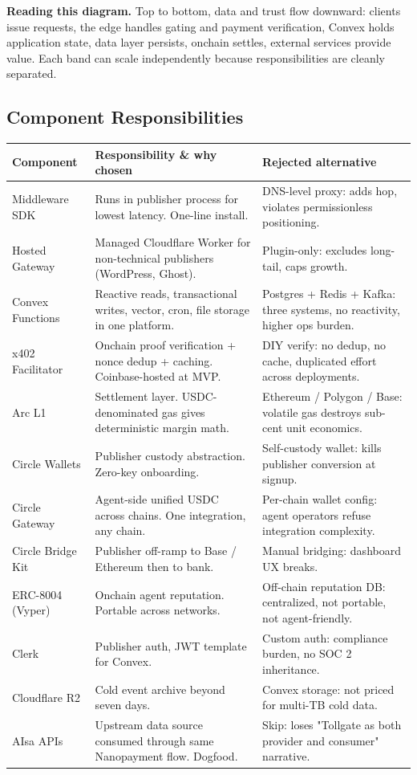 \documentclass[11pt,a4paper]{article}
\begin{document}
\textbf{Reading this diagram.} Top to bottom, data and trust flow downward: clients issue requests, the edge handles gating and payment verification, Convex holds application state, data layer persists, onchain settles, external services provide value. Each band can scale independently because responsibilities are cleanly separated.

\subsection{Component Responsibilities}

\begin{table}[H]
\centering
\footnotesize
\begin{tabularx}{\textwidth}{@{} l X l @{}}
\toprule
\textbf{Component} & \textbf{Responsibility \& why chosen} & \textbf{Rejected alternative} \\
\midrule
Middleware SDK & Runs in publisher process for lowest latency. One-line install. & DNS-level proxy: adds hop, violates permissionless positioning. \\
Hosted Gateway & Managed Cloudflare Worker for non-technical publishers (WordPress, Ghost). & Plugin-only: excludes long-tail, caps growth. \\
Convex Functions & Reactive reads, transactional writes, vector, cron, file storage in one platform. & Postgres + Redis + Kafka: three systems, no reactivity, higher ops burden. \\
x402 Facilitator & Onchain proof verification + nonce dedup + caching. Coinbase-hosted at MVP. & DIY verify: no dedup, no cache, duplicated effort across deployments. \\
Arc L1 & Settlement layer. USDC-denominated gas gives deterministic margin math. & Ethereum / Polygon / Base: volatile gas destroys sub-cent unit economics. \\
Circle Wallets & Publisher custody abstraction. Zero-key onboarding. & Self-custody wallet: kills publisher conversion at signup. \\
Circle Gateway & Agent-side unified USDC across chains. One integration, any chain. & Per-chain wallet config: agent operators refuse integration complexity. \\
Circle Bridge Kit & Publisher off-ramp to Base / Ethereum then to bank. & Manual bridging: dashboard UX breaks. \\
ERC-8004 (Vyper) & Onchain agent reputation. Portable across networks. & Off-chain reputation DB: centralized, not portable, not agent-friendly. \\
Clerk & Publisher auth, JWT template for Convex. & Custom auth: compliance burden, no SOC 2 inheritance. \\
Cloudflare R2 & Cold event archive beyond seven days. & Convex storage: not priced for multi-TB cold data. \\
AIsa APIs & Upstream data source consumed through same Nanopayment flow. Dogfood. & Skip: loses "Tollgate as both provider and consumer" narrative. \\
\bottomrule
\end{tabularx}
\end{table}
\end{document}

